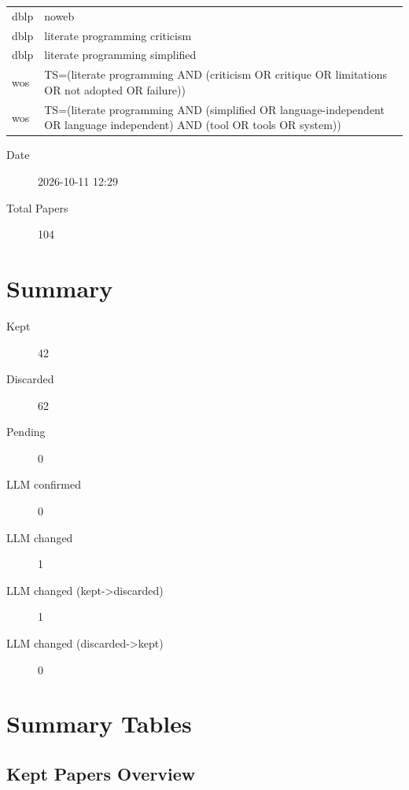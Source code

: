 \documentclass{article}
\begin{document}
\begin{longtable}{lp{10cm}}
dblp & noweb \\
dblp & literate programming criticism \\
dblp & literate programming simplified \\
wos & TS=(\textquotedbl{}literate programming\textquotedbl{} AND (criticism OR critique OR limitations OR \textquotedbl{}not adopted\textquotedbl{} OR failure)) \\
wos & TS=(\textquotedbl{}literate programming\textquotedbl{} AND (simplified OR \textquotedbl{}language-independent\textquotedbl{} OR \textquotedbl{}language independent\textquotedbl{}) AND (tool OR tools OR system)) \\
\bottomrule
\end{longtable}

\begin{description}
\item[Date] 2026-10-11 12:29
\item[Total Papers] 104
\end{description}

\section{Summary}
\begin{description}
\item[Kept] 42
\item[Discarded] 62
\item[Pending] 0
\item[LLM confirmed] 0
\item[LLM changed] 1
\item[LLM changed (kept->discarded)] 1
\item[LLM changed (discarded->kept)] 0
\end{description}

\section{Summary Tables}

\subsection{Kept Papers Overview}
\end{document}
